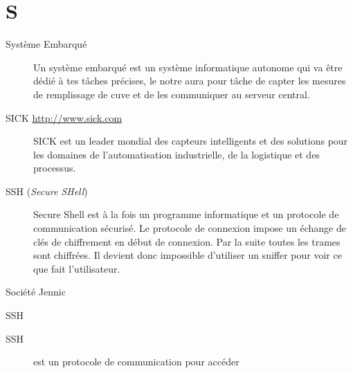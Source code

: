 \section{S}

\begin{description}

\item[Système Embarqué] Un système embarqué est un système informatique autonome
qui va être dédié à tes tâches précises, le notre aura pour tâche de capter les 
mesures de remplissage de cuve et de les communiquer au serveur central.

\item[SICK \url{http://www.sick.com}]
SICK est un leader mondial des capteurs intelligents et des solutions pour les domaines de l’automatisation industrielle, de la logistique et des processus.

\item[SSH (\textsl{Secure SHell})]
Secure Shell est à la fois un programme informatique et un protocole de communication sécurisé. Le protocole de connexion impose un échange de clés de chiffrement en début de connexion. Par la suite toutes les trames sont chiffrées. Il devient donc impossible d'utiliser un sniffer pour voir ce que fait l'utilisateur.

\item[Société Jennic]



\end{description}

SSH

\begin{description}

\item[SSH] est un protocole de communication pour accéder 


\end{description}


